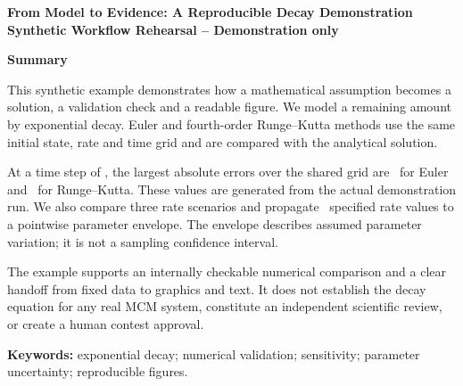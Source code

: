 \begin{center}
\textbf{From Model to Evidence: A Reproducible Decay Demonstration}\\[0.5em]
\textbf{Synthetic Workflow Rehearsal -- Demonstration only}
\end{center}
\noindent\textbf{Summary}\par
This synthetic example demonstrates how a mathematical assumption becomes a
solution, a validation check and a readable figure. We model a remaining amount
by exponential decay. Euler and fourth-order Runge--Kutta methods use the same
initial state, rate and time grid and are compared with the analytical solution.

At a time step of \FigureDemoStep, the largest absolute errors over the shared
grid are \FigureDemoEulerError\ for Euler and \FigureDemoRKError\ for Runge--Kutta.
These values are generated from the actual demonstration run. We also compare
three rate scenarios and propagate \FigureDemoRateCount\ specified rate values
to a pointwise parameter envelope. The envelope describes assumed parameter
variation; it is not a sampling confidence interval.

The example supports an internally checkable numerical comparison and a clear
handoff from fixed data to graphics and text. It does not establish the decay
equation for any real MCM system, constitute an independent scientific review,
or create a human contest approval.

\noindent\textbf{Keywords:} exponential decay; numerical validation; sensitivity;
parameter uncertainty; reproducible figures.
